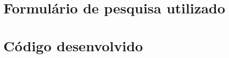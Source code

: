 
\begin{anexosenv}
\chapter{Formulário de pesquisa utilizado}
\label{anexoA}

\lipsum[4]

\chapter{Código desenvolvido}

\lipsum[4]


\end{anexosenv}
